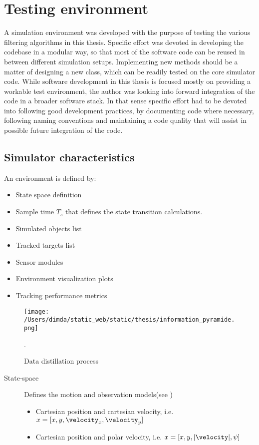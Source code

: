 
\chapter{Testing environment }

A simulation environment was developed with the purpose of testing the various filtering algorithms in this thesis. Specific effort was devoted in developing the codebase in a modular way, so that most of the software code can be reused in between different simulation setups. Implementing new methods should be a matter of designing a new class, which can be readily tested on the core simulator code. While software development in this thesis is focused mostly on providing a workable test environment, the author was looking into forward integration of the code in a broader software stack. In that sense specific effort had to be devoted into following good development practices, by documenting code where necessary, following naming conventions and maintaining a code quality that will assist in possible future integration of the code.


\section{Simulator characteristics}

An environment is defined by:
\begin{itemize}
	\item State space definition 
	\item Sample time $T_s$ that defines the state transition calculations.
	\item Simulated objects list
	\item Tracked targets list
	\item Sensor modules
	\item Environment visualization plots
	\item Tracking performance metrics
\end{itemize}


\begin{figure}[H]
	\centering
	\texttt{[image: /Users/dimda/static\_web/static/thesis/information\_pyramide.png]}
	\caption{Data distillation process}.
	\label{fig:information_pyramide}
\end{figure}


\begin{description}
	\item[State-space] Defines the motion and observation models(see )
	\begin{itemize}
		\item Cartesian position and cartesian velocity, i.e. $ x=[x,y,\velocity_x, \velocity_y] $
		\item Cartesian position and polar velocity, i.e. $ x = [x,y,|\velocity|,\heading]$
	\end{itemize}
\end{description}

